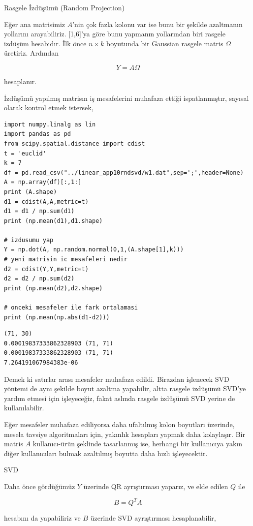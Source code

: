 \documentclass[12pt,fleqn]{article}\usepackage{../../common}
\begin{document}
Rasgele İzdüşümü (Random Projection) 

Eğer ana matrisimiz $A$'nin çok fazla kolonu var ise bunu bir şekilde azaltmanın
yollarını arayabiliriz. [1,6]'ya göre bunu yapmanın yollarından biri rasgele
izdüşüm hesabıdır. İlk önce $n \times k$ boyutunda bir Gaussian rasgele matris
$\Omega$ üretiriz. Ardından

$$ Y = A\Omega $$

hesaplanır. 

İzdüşümü yapılmış matrisın iş mesafelerini muhafaza ettiği ispatlanmıştır,
sayısal olarak kontrol etmek istersek,

\begin{verbatim}
import numpy.linalg as lin
import pandas as pd
from scipy.spatial.distance import cdist
t = 'euclid'
k = 7
df = pd.read_csv("../linear_app10rndsvd/w1.dat",sep=';',header=None)
A = np.array(df)[:,1:]
print (A.shape)
d1 = cdist(A,A,metric=t)
d1 = d1 / np.sum(d1)
print (np.mean(d1),d1.shape)

# izdusumu yap
Y = np.dot(A, np.random.normal(0,1,(A.shape[1],k)))
# yeni matrisin ic mesafeleri nedir
d2 = cdist(Y,Y,metric=t)
d2 = d2 / np.sum(d2)
print (np.mean(d2),d2.shape)

# onceki mesafeler ile fark ortalamasi
print (np.mean(np.abs(d1-d2)))
\end{verbatim}

\begin{verbatim}
(71, 30)
0.00019837333862328903 (71, 71)
0.00019837333862328903 (71, 71)
7.264191067984383e-06
\end{verbatim}

Demek ki satırlar arası mesafeler muhafaza edildi. Birazdan işlenecek SVD
yöntemi de aynı şekilde boyut azaltma yapabilir, altta rasgele izdüşümü
SVD'ye yardım etmesi için işleyeceğiz, fakat aslında rasgele izdüşümü SVD
yerine de kullanılabilir.

Eğer mesafeler muhafaza ediliyorsa daha ufaltılmış kolon boyutları üzerinde,
mesela tavsiye algoritmaları için, yakınlık hesapları yapmak daha kolaylaşır.
Bir matris $A$ kullanıcı-ürün şeklinde tasarlanmış ise, herhangi bir kullanıcıya
yakın diğer kullanıcıları bulmak azaltılmış boyutta daha hızlı işleyecektir.

SVD

Daha önce gördüğümüz $Y$ üzerinde QR ayrıştırması yaparız, ve elde edilen $Q$
ile

$$ B = Q^T A $$

hesabını da yapabiliriz ve $B$ üzerinde SVD ayrıştırması hesaplanabilir,
\end{document}
